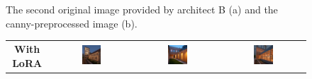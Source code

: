 \begin{figure}[H]
\begin{subfigure}[b]{0.3\textwidth}
        \caption{}
        \label{A-unstructured-1-sketch-prep}
    \end{subfigure}
    \caption{The second original image provided by architect B (a) and the canny-preprocessed image (b).}
    \label{fig:B-screenshot-2}
\end{figure}

\begin{figure}[H]
  \centering
  {\footnotesize
  \renewcommand{\arraystretch}{1.1}
  \setlength{\tabcolsep}{4pt}
  \begin{tabular}{c c c c}
    \textbf{With LoRA} &
    \includegraphics[width=0.25\textwidth]{Images/Results/Architect-B_unstructured-phase/generated_images/2/Met_lora_00004_.png} &
    \includegraphics[width=0.25\textwidth]{Images/Results/Architect-B_unstructured-phase/generated_images/2/Met_lora_00005_.png} &
    \includegraphics[width=0.25\textwidth]{Images/Results/Architect-B_unstructured-phase/generated_images/2/Met_lora_00007_.png} \\


\end{tabular}}
\end{figure}
